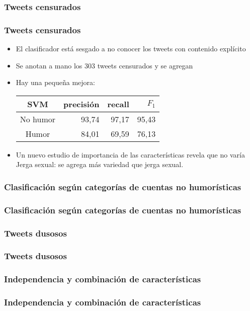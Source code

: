 \subsubsection{Tweets censurados}
\begin{frame}
    \frametitle{Tweets censurados}

    \begin{itemize}[<+->]
        \item El clasificador está sesgado a no conocer los tweets con contenido explícito
        \item Se anotan a mano los 303 tweets censurados y se agregan
        \item Hay una pequeña mejora:
        \begin{center}
            \begin{tabular}{ c | r | r | r }
                \textbf{SVM} & precisión & recall & $F_1$ \\
                \hline
                No humor & 93,74 & 97,17 & 95,43 \\
                \hline
                Humor & 84,01 & 69,59 & 76,13 \\
            \end{tabular}
        \end{center}
        \item Un nuevo estudio de importancia de las características revela que no varía Jerga sexual: se agrega más variedad que jerga sexual.
    \end{itemize}
\end{frame}

\subsubsection{Clasificación según categorías de cuentas no humorísticas}
\begin{frame}
    \frametitle{Clasificación según categorías de cuentas no humorísticas}

    
\end{frame}

\subsubsection{Tweets dusosos}
\begin{frame}
    \frametitle{Tweets dusosos}

    
\end{frame}

\subsubsection{Independencia y combinación de características}
\begin{frame}
    \frametitle{Independencia y combinación de características}

    
\end{frame}
